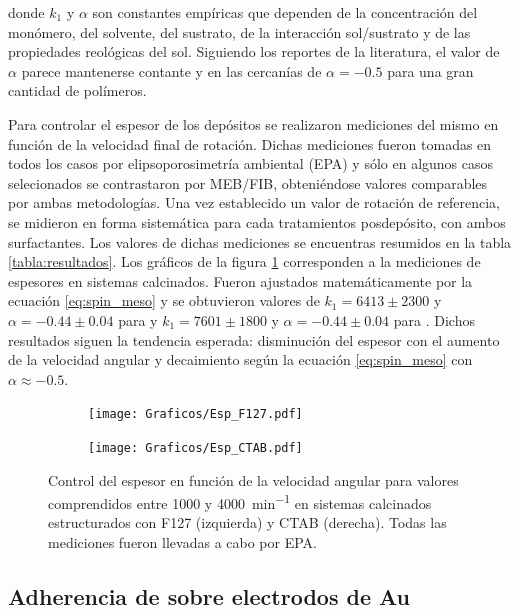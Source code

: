 		\noindent donde $k_1$ y $\alpha$ son constantes empíricas que dependen de la concentración del monómero, del solvente, del sustrato, de la interacción sol/sustrato y  de las propiedades reológicas del sol. Siguiendo los reportes de la literatura, el valor de $\alpha$ parece mantenerse contante y en las cercanías de $\alpha=-0.5$ para una gran cantidad de polímeros.\cite{Meyerhofer1978,Bornside1989,Lora1990}

		Para controlar el espesor de los depósitos se realizaron mediciones del mismo en función de la velocidad final de rotación.  Dichas mediciones fueron tomadas en todos los casos por elipsoporosimetría ambiental (EPA) y sólo en algunos casos selecionados se contrastaron por MEB/FIB, obteniéndose valores comparables por ambas metodologías. Una vez establecido un valor de rotación de referencia, se midieron en forma sistemática para cada tratamientos posdepósito, con ambos surfactantes. Los valores de dichas mediciones se encuentras resumidos en la tabla \ref{tabla:resultados}.
		Los gráficos de la figura \ref{fig:esp} corresponden a la mediciones de espesores en sistemas calcinados. Fueron ajustados matemáticamente por la ecuación \ref{eq:spin_meso} y se obtuvieron valores de $k_1=6413\pm 2300$ y $\alpha=-0.44 \pm 0.04$ para \pdmF\space y $k_1=7601\pm 1800$ y $\alpha=-0.44 \pm 0.04$ para \pdmC. Dichos resultados siguen la tendencia esperada: disminución del espesor con el aumento de la velocidad angular y decaimiento según la ecuación \ref{eq:spin_meso} con $\alpha \approx -0.5$. 

		
			\begin{figure}[!ht]
				\begin{subfigure}[t]{0.495\textwidth}
				\texttt{[image: Graficos/Esp\_F127.pdf]}
				\end{subfigure}
				\begin{subfigure}[t]{0.495\textwidth}
				\texttt{[image: Graficos/Esp\_CTAB.pdf]}
				\end{subfigure}
				\caption[Espesor en función de la velocidad angular]{Control del espesor en función de la velocidad angular para valores comprendidos entre 1000 y \SI{4000}{\minute^{-1}} en sistemas calcinados estructurados con F127 (izquierda) y CTAB (derecha). Todas las mediciones fueron llevadas a cabo por EPA.}
				\label{fig:esp}		
				\end{figure}
	
	\subsection{Adherencia de \pdm\space sobre electrodos de Au}	

